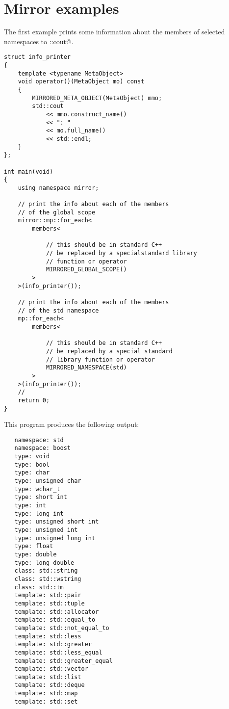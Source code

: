 \section{Mirror examples}
\label{appendix-mirror-examples}

The first example prints some information about the members of selected
namespaces to \verb@std::cout@.

\begin{verbatim}
struct info_printer
{
    template <typename MetaObject>
    void operator()(MetaObject mo) const
    {
        MIRRORED_META_OBJECT(MetaObject) mmo;
        std::cout
            << mmo.construct_name()
            << ": "
            << mo.full_name()
            << std::endl;
    }
};

int main(void)
{
    using namespace mirror;

    // print the info about each of the members
    // of the global scope
    mirror::mp::for_each<
        members<

            // this should be in standard C++
            // be replaced by a specialstandard library
            // function or operator
            MIRRORED_GLOBAL_SCOPE()
        >
    >(info_printer());

    // print the info about each of the members
    // of the std namespace
    mp::for_each<
        members<

            // this should be in standard C++
            // be replaced by a special standard
            // library function or operator
            MIRRORED_NAMESPACE(std)
        >
    >(info_printer());
    //
    return 0;
}
\end{verbatim}

This program produces the following output:

\begin{verbatim}
   namespace: std
   namespace: boost
   type: void
   type: bool
   type: char
   type: unsigned char
   type: wchar_t
   type: short int
   type: int
   type: long int
   type: unsigned short int
   type: unsigned int
   type: unsigned long int
   type: float
   type: double
   type: long double
   class: std::string
   class: std::wstring
   class: std::tm
   template: std::pair
   template: std::tuple
   template: std::allocator
   template: std::equal_to
   template: std::not_equal_to
   template: std::less
   template: std::greater
   template: std::less_equal
   template: std::greater_equal
   template: std::vector
   template: std::list
   template: std::deque
   template: std::map
   template: std::set
\end{verbatim}

